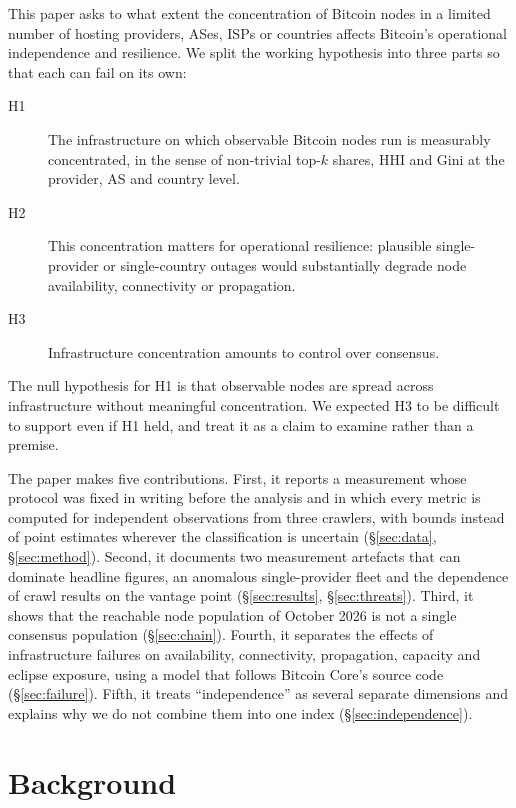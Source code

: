 \documentclass[10pt,a4paper]{article}
\begin{document}
This paper asks to what extent the concentration of Bitcoin nodes in a limited number of hosting providers, ASes, ISPs or countries affects Bitcoin's operational independence and resilience. We split the working hypothesis into three parts so that each can fail on its own:

\begin{description}
\item[H1] The infrastructure on which observable Bitcoin nodes run is measurably concentrated, in the sense of non-trivial top-$k$ shares, HHI and Gini at the provider, AS and country level.
\item[H2] This concentration matters for operational resilience: plausible single-provider or single-country outages would substantially degrade node availability, connectivity or propagation.
\item[H3] Infrastructure concentration amounts to control over consensus.
\end{description}

\noindent The null hypothesis for H1 is that observable nodes are spread across infrastructure without meaningful concentration. We expected H3 to be difficult to support even if H1 held, and treat it as a claim to examine rather than a premise.

The paper makes five contributions. First, it reports a measurement whose protocol was fixed in writing before the analysis and in which every metric is computed for independent observations from three crawlers, with bounds instead of point estimates wherever the classification is uncertain (\S\ref{sec:data}, \S\ref{sec:method}). Second, it documents two measurement artefacts that can dominate headline figures, an anomalous single-provider fleet and the dependence of crawl results on the vantage point (\S\ref{sec:results}, \S\ref{sec:threats}). Third, it shows that the reachable node population of October 2026 is not a single consensus population (\S\ref{sec:chain}). Fourth, it separates the effects of infrastructure failures on availability, connectivity, propagation, capacity and eclipse exposure, using a model that follows Bitcoin Core's source code (\S\ref{sec:failure}). Fifth, it treats ``independence'' as several separate dimensions and explains why we do not combine them into one index (\S\ref{sec:independence}).

\section{Background}\label{sec:background}
\end{document}
